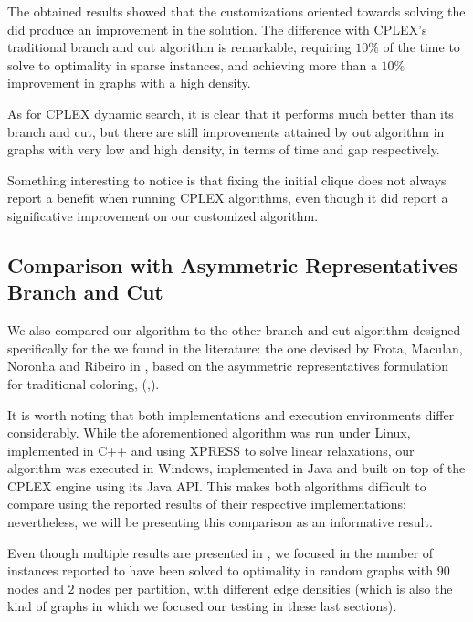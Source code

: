 The obtained results showed that the customizations oriented towards solving the \PCP{} did produce an improvement in the solution. The difference with \textsc{CPLEX}'s traditional branch and cut algorithm is remarkable, requiring $10\%$ of the time to solve to optimality in sparse instances, and achieving more than a $10\%$ improvement in graphs with a high density.

As for \textsc{CPLEX} dynamic search, it is clear that it performs much better than its branch and cut, but there are still improvements attained by out algorithm in graphs with very low and high density, in terms of time and gap respectively.

Something interesting to notice is that fixing the initial clique does not always report a benefit when running \textsc{CPLEX} algorithms, even though it did report a significative improvement on our customized algorithm.

\subsection{Comparison with Asymmetric Representatives Branch and Cut}

We also compared our algorithm to the other branch and cut algorithm designed specifically for the \PCP{} we found in the literature: the one devised by Frota, Maculan, Noronha and Ribeiro in \cite{frota2010branch}, based on the asymmetric representatives formulation for traditional coloring, (\cite{campelo2004cliques},\cite{campelo2008asymmetric}).

It is worth noting that both implementations and execution environments differ considerably. While the aforementioned algorithm was run under Linux, implemented in C++ and  using \textsc{XPRESS} to solve linear relaxations, our algorithm was executed in Windows, implemented in Java and built on top of the \textsc{CPLEX} engine using its Java API. This makes both algorithms difficult to compare using the reported results of their respective implementations; nevertheless, we will be presenting this comparison as an informative result.

Even though multiple results are presented in \cite{frota2010branch}, we focused in the number of instances reported to have been solved to optimality in random graphs with $90$ nodes and $2$ nodes per partition, with different edge densities (which is also the kind of graphs in which we focused our testing in these last sections). 

